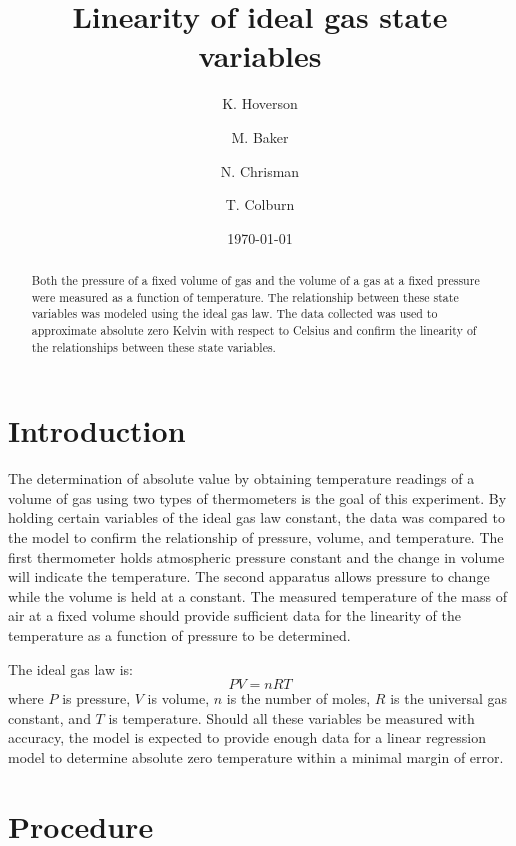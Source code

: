 \documentclass[%
 aip,
 jmp,%
 amsmath,amssymb,
 reprint,%
]{revtex4-1}
\begin{document}
\author{K. Hoverson}
\author{M. Baker}
\author{N. Chrisman}
\author{T. Colburn}
%
\title[Linearity of ideal gas state variables]{Linearity of ideal gas state variables}
\date{\today}
\begin{abstract}
  Both the pressure of a fixed volume of gas and the volume of a gas at a fixed pressure were measured as a function of temperature. The relationship between these state variables was modeled using the ideal gas law. The data collected was used to approximate absolute zero Kelvin with respect to Celsius and confirm the linearity of the relationships between these state variables.
\end{abstract}

\maketitle

\section{Introduction}

  The determination of absolute value by obtaining temperature readings of a volume of gas using two types of thermometers is the goal of this experiment.  By holding certain variables of the ideal gas law constant, the data was compared to the model to confirm the relationship of pressure, volume, and temperature.  The first thermometer holds atmospheric pressure constant and the change in volume will indicate the temperature. The second apparatus allows pressure to change while the volume is held at a constant. The measured temperature of the mass of air at a fixed volume should provide sufficient data for the linearity of the temperature as a function of pressure to be determined.

  The ideal gas law is:
  $$PV = nRT$$
  where $P$ is pressure, $V$ is volume, $n$ is the number of moles, $R$ is the universal gas constant, and $T$ is temperature. Should all these variables be measured with accuracy, the model is expected to provide enough data for a linear regression model to determine absolute zero temperature within a minimal margin of error.

\section{Procedure}
\end{document}
